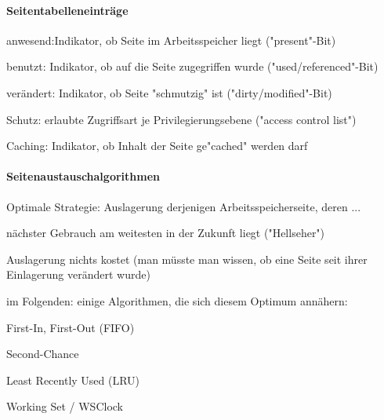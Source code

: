 \documentclass[a4pape]{article}
\begin{document}
\begin{multicols}{3}
  \paragraph{Seitentabelleneinträge}
  \begin{itemize*}
    \item anwesend:Indikator, ob Seite im Arbeitsspeicher liegt ("present"-Bit)
    \item benutzt: Indikator, ob auf die Seite zugegriffen wurde ("used/referenced"-Bit)
    \item verändert: Indikator, ob Seite "schmutzig" ist ("dirty/modified"-Bit)
    \item Schutz: erlaubte Zugriffsart je Privilegierungsebene ("access control list")
    \item Caching: Indikator, ob Inhalt der Seite ge"cached" werden darf
  \end{itemize*}

  \paragraph{Seitenaustauschalgorithmen}
  \begin{itemize*}
    \item Optimale Strategie: Auslagerung derjenigen Arbeitsspeicherseite, deren ...
    \begin{itemize*}
      \item nächster Gebrauch am weitesten in der Zukunft liegt ("Hellseher")
      \item Auslagerung nichts kostet (man müsste man wissen, ob eine Seite seit ihrer Einlagerung verändert wurde)
    \end{itemize*}
    \item im Folgenden: einige Algorithmen, die sich diesem Optimum annähern:
    \begin{itemize*}
      \item First-In, First-Out (FIFO)
      \item Second-Chance
      \item Least Recently Used (LRU)
      \item Working Set / WSClock
    \end{itemize*}
  \end{itemize*}


\end{multicols}
\end{document}
